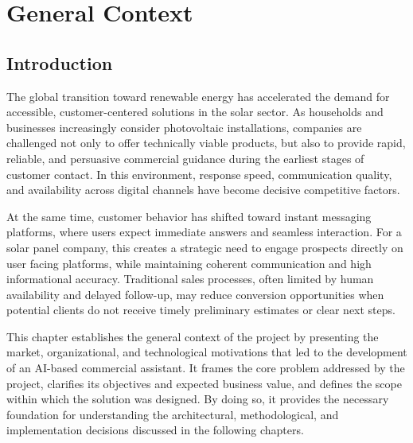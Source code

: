 \fancyhf{}
\setlength{\headheight}{14.49998pt}
\lhead{\textsl{\footnotesize{\nouppercase{\rightmark}}}}
\rhead{\textsl{\footnotesize{\nouppercase{\leftmark}}}}

\cfoot{\thepage}
\rfoot{\textsl{\footnotesize}}

\chapter{General Context}

\section{Introduction}
The global transition toward renewable energy\cite{iea_renewables_2024} has accelerated the demand for accessible, customer-centered solutions in the solar sector. As households and businesses increasingly consider photovoltaic installations\cite{irena_capacity_2024}, companies are challenged not only to offer technically viable products, but also to provide rapid, reliable, and persuasive commercial guidance during the earliest stages of customer contact. In this environment, response speed, communication quality, and availability across digital channels have become decisive competitive factors.

At the same time, customer behavior has shifted toward instant messaging platforms, where users expect immediate answers and seamless interaction. For a solar panel company, this creates a strategic need to engage prospects directly on user facing platforms, while maintaining coherent communication and high informational accuracy. Traditional sales processes, often limited by human availability and delayed follow-up, may reduce conversion opportunities when potential clients do not receive timely preliminary estimates or clear next steps.

This chapter establishes the general context of the project by presenting the market, organizational, and technological motivations that led to the development of an AI-based commercial assistant. It frames the core problem addressed by the project, clarifies its objectives and expected business value, and defines the scope within which the solution was designed. By doing so, it provides the necessary foundation for understanding the architectural, methodological, and implementation decisions discussed in the following chapters.
